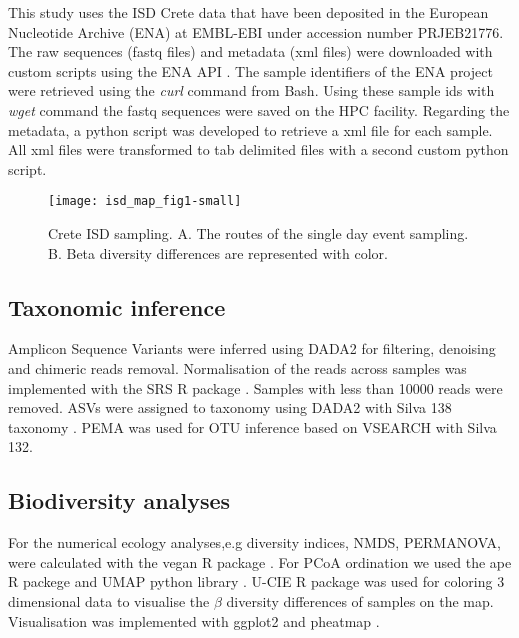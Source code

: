 This study uses the ISD Crete data that have been deposited
in the European Nucleotide Archive (ENA) at EMBL-EBI under accession number PRJEB21776.
The raw sequences (fastq files) and metadata (xml files) were downloaded with custom scripts using the ENA API \parencite{Yuan2023}.
The sample identifiers of the ENA project were retrieved using the \textit{curl} command from Bash. Using these 
sample ids with \textit{wget} command the fastq sequences were saved on the HPC facility. Regarding the metadata, 
a python script was developed to retrieve a xml file for each sample. All xml files
were transformed to tab delimited files with a second custom python script.

\begin{figure}[htp!] 
    \centering\texttt{[image: isd\_map\_fig1-small]}
    \caption{Crete ISD sampling. A. The routes of the single day event sampling. B. Beta diversity differences are represented with color.}
    \label{fig:isd_crete_sampling}
\end{figure}

\subsection{Taxonomic inference}\label{tax_inference}
Amplicon Sequence Variants were inferred using DADA2 \parencite{Callahan2016} for 
filtering, denoising and chimeric reads removal. Normalisation of the reads
across samples was implemented with the SRS R package \parencite{Beule2020}. Samples
with less than 10000 reads were removed. ASVs were assigned to taxonomy using 
DADA2 with Silva 138 taxonomy \parencite{quast_silva_2013}.
PEMA was used for OTU inference based on VSEARCH \parencite{zafeiropoulos2020pema} with Silva 132.

\subsection{Biodiversity analyses}\label{biodiversity}

For the numerical ecology analyses,e.g diversity indices, NMDS, PERMANOVA, were calculated
with the vegan R package \parencite{oksanen2024vegan}.
For PCoA ordination we used the ape R packege \parencite{Paradis2004} and UMAP python library \parencite{mcinnes2018umap-software}.
U-CIE R package was used for coloring 3 dimensional data \parencite{Koutrouli2022} to 
visualise the $\beta$ diversity differences of samples on the map.
Visualisation was implemented with ggplot2 \parencite{wickham_ggplot2_2016} and pheatmap \parencite{Kolde2019}.

